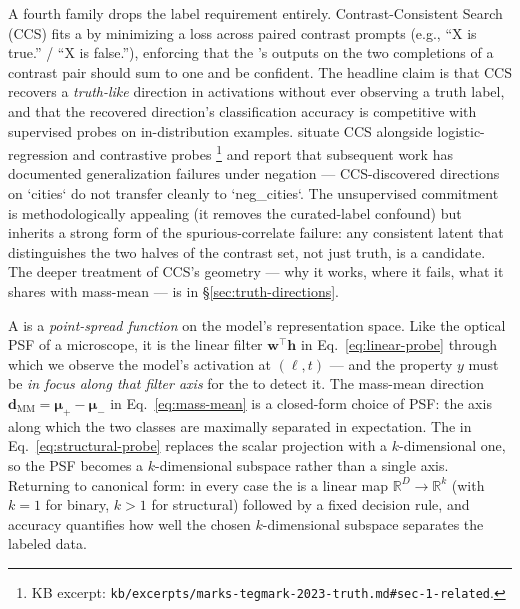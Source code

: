 A fourth  family drops the label requirement entirely. Contrast-Consistent
Search (CCS)  fits a
 by minimizing a  loss across paired
contrast prompts (e.g., ``X is true.'' / ``X is false.''), enforcing
that the 's outputs on the two completions of a contrast pair
should sum to one and be confident. The headline claim is that CCS
recovers a \emph{truth-like} direction in  activations without
ever observing a truth label, and that the recovered direction's
classification accuracy is competitive with supervised probes on
in-distribution examples. \citet{marks-tegmark-2023-truth} situate
CCS alongside logistic-regression and contrastive probes
\citep[\S 1.1]{marks-tegmark-2023-truth}\footnote{KB excerpt:
\texttt{kb/excerpts/marks-tegmark-2023-truth.md\#sec-1-related}.} and
report that subsequent work has documented generalization failures
under negation — CCS-discovered directions on `cities` do not transfer
cleanly to `neg\_cities`. The unsupervised commitment is methodologically
appealing (it removes the curated-label confound) but inherits a strong
form of the spurious-correlate failure: any consistent latent 
that distinguishes the two halves of the contrast set, not just truth,
is a candidate. The deeper treatment of CCS's geometry — why it works,
where it fails, what it shares with mass-mean — is in
\S\ref{sec:truth-directions}.

\begin{intuition}
A  is a \emph{point-spread function} on the model's representation
space. Like the optical PSF of a microscope, it is the linear filter
$\mathbf{w}^\top \mathbf{h}$ in Eq.~\eqref{eq:linear-probe} through which
we observe the model's activation at $(\ell, t)$ — and the property $y$
must be \emph{in focus along that filter axis} for the  to detect
it. The mass-mean direction
$\mathbf{d}_{\mathrm{MM}} = \boldsymbol{\mu}_+ - \boldsymbol{\mu}_-$ in
Eq.~\eqref{eq:mass-mean} is a closed-form choice of PSF: the axis along
which the two classes are maximally separated in expectation. The
 in Eq.~\eqref{eq:structural-probe} replaces the scalar
projection with a $k$-dimensional one, so the PSF becomes a
$k$-dimensional subspace rather than a single axis. Returning to
canonical form: in every case the  is a linear map
$\mathbb{R}^D \to \mathbb{R}^k$ (with $k = 1$ for binary, $k > 1$ for
structural) followed by a fixed decision rule, and  accuracy
quantifies how well the chosen $k$-dimensional subspace separates the
labeled data.
\end{intuition}

